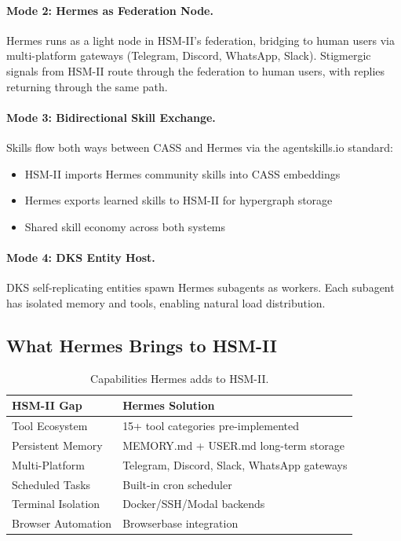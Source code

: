 \documentclass[11pt]{article}
\begin{document}
\paragraph{Mode 2: Hermes as Federation Node.}
Hermes runs as a light node in HSM-II's federation, bridging to human users via
multi-platform gateways (Telegram, Discord, WhatsApp, Slack). Stigmergic signals
from HSM-II route through the federation to human users, with replies returning
through the same path.

\paragraph{Mode 3: Bidirectional Skill Exchange.}
Skills flow both ways between CASS and Hermes via the agentskills.io standard:
\begin{itemize}[noitemsep,topsep=4pt]
  \item HSM-II imports Hermes community skills into CASS embeddings
  \item Hermes exports learned skills to HSM-II for hypergraph storage
  \item Shared skill economy across both systems
\end{itemize}

\paragraph{Mode 4: DKS Entity Host.}
DKS self-replicating entities spawn Hermes subagents as workers. Each subagent
has isolated memory and tools, enabling natural load distribution.

\subsection{What Hermes Brings to HSM-II}

\begin{table}[H]
\centering
\caption{Capabilities Hermes adds to HSM-II.}
\label{tab:hermes_capabilities}
\small
\begin{tabular}{ll}
\toprule
\textbf{HSM-II Gap} & \textbf{Hermes Solution} \\
\midrule
Tool Ecosystem & 15+ tool categories pre-implemented \\
Persistent Memory & MEMORY.md + USER.md long-term storage \\
Multi-Platform & Telegram, Discord, Slack, WhatsApp gateways \\
Scheduled Tasks & Built-in cron scheduler \\
Terminal Isolation & Docker/SSH/Modal backends \\
Browser Automation & Browserbase integration \\
\bottomrule
\end{tabular}
\end{table}
\end{document}
